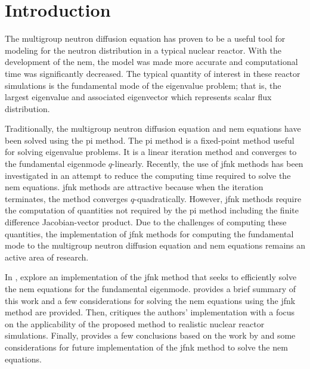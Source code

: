 \section{Introduction}
\label{sec:introduction}

  The multigroup neutron diffusion equation has proven to be a useful tool for
  modeling for the neutron distribution in a typical nuclear reactor. With the
  development of the \gls{nem}, the model was made more accurate and
  computational time was significantly decreased. The typical quantity of
  interest in these reactor simulations is the fundamental mode of the
  eigenvalue problem; that is, the largest eigenvalue and associated eigenvector
  which represents scalar flux distribution.

  Traditionally, the multigroup neutron diffusion equation and \gls{nem}
  equations have been solved using the \gls{pi} method. The \gls{pi} method is a
  fixed-point method useful for solving eigenvalue problems. It is a linear
  iteration method and converges to the fundamental eigenmode $q$-linearly.
  Recently, the use of \gls{jfnk} methods has been investigated in an attempt to
  reduce the computing time required to solve the \gls{nem} equations.
  \gls{jfnk} methods are attractive because when the iteration terminates, the
  method converges $q$-quadratically. However, \gls{jfnk} methods require the
  computation of quantities not required by the \gls{pi} method including the
  finite difference Jacobian-vector product. Due to the challenges of computing
  these quantities, the implementation of \gls{jfnk} methods for computing the
  fundamental mode to the multigroup neutron diffusion equation and \gls{nem}
  equations remains an active area of research.

  In , \citeauthor{qe2paper} explore an implementation of
  the \gls{jfnk} method that seeks to efficiently solve the \gls{nem} equations
  for the fundamental eigenmode.  provides a brief summary of
  this work and a few considerations for solving the \gls{nem} equations using
  the \gls{jfnk} method are provided. Then,  critiques the
  authors' implementation with a focus on the applicability of the proposed
  method to realistic nuclear reactor simulations. Finally,
   provides a few conclusions based on the work by
  \citeauthor{qe2paper} and some considerations for future implementation of the 
  \gls{jfnk} method to solve the \gls{nem} equations.
